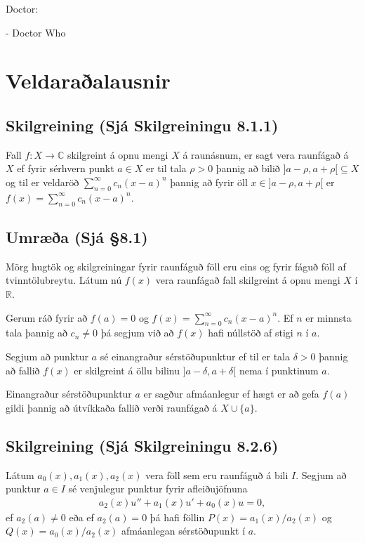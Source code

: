\documentclass[a4paper,10pt,icelandic]{sphinxmanual}
\begin{document}
Doctor: 

- Doctor Who


\section{Veldaraðalausnir}
\label{\detokenize{Kafli08:veldaraalausnir}}

\subsection{Skilgreining (Sjá Skilgreiningu 8.1.1)}
\label{\detokenize{Kafli08:skilgreining-sja-skilgreiningu-8-1-1}}
Fall \(f:X\to {\mathbb{C}}\) skilgreint á opnu mengi \(X\) á raunásnum, er sagt vera raunfágað á \(X\) ef fyrir sérhvern punkt \(a\in X\) er til tala \(\rho>0\) þannig að bilið \(]a-\rho, a+\rho[\subseteq X\) og til er veldaröð \(\sum_{n=0}^\infty c_n(x-a)^n\) þannig að fyrir öll \(x\in ]a-\rho, a+\rho[\) er \(f(x)=\sum_{n=0}^\infty c_n(x-a)^n\).


\subsection{Umræða (Sjá \S{}8.1)}
\label{\detokenize{Kafli08:umraea-sja-8-1}}
Mörg hugtök og skilgreiningar fyrir raunfáguð föll eru eins og fyrir fáguð föll af tvinntölubreytu. Látum nú \(f(x)\) vera raunfágað fall skilgreint á opnu mengi \(X\) í \(\mathbb{R}\).

Gerum ráð fyrir að \(f(a)=0\) og \(f(x)=\sum_{n=0}^\infty c_n(x-a)^n\). Ef \(n\) er minnsta tala þannig að \(c_n\neq 0\) þá segjum við að \(f(x)\) hafi núllstöð af stigi \(n\) í \(a\).

Segjum að punktur \(a\) sé einangraður sérstöðupunktur ef til er tala \(\delta>0\) þannig að fallið \(f(x)\) er skilgreint á öllu bilinu \(]a-\delta, a+\delta[\) nema í punktinum \(a\).

Einangraður sérstöðupunktur \(a\) er sagður afmáanlegur ef hægt er að gefa \(f(a)\) gildi þannig að útvíkkaða fallið verði raunfágað á \(X\cup\{a\}\).


\subsection{Skilgreining (Sjá Skilgreiningu 8.2.6)}
\label{\detokenize{Kafli08:skilgreining-sja-skilgreiningu-8-2-6}}
Látum \(a_0(x), a_1(x), a_2(x)\) vera föll sem eru raunfáguð á bili \(I\). Segjum að punktur \(a\in I\) sé venjulegur punktur fyrir afleiðujöfnuna
\begin{equation*}
\begin{split}a_2(x)u''+a_1(x)u'+a_0(x)u=0,\end{split}
\end{equation*}
ef \(a_2(a)\neq 0\) eða ef \(a_2(a)=0\) þá hafi föllin \(P(x)=a_1(x)/a_2(x)\) og \(Q(x)=a_0(x)/a_2(x)\) afmáanlegan sérstöðupunkt í \(a\).
\end{document}
